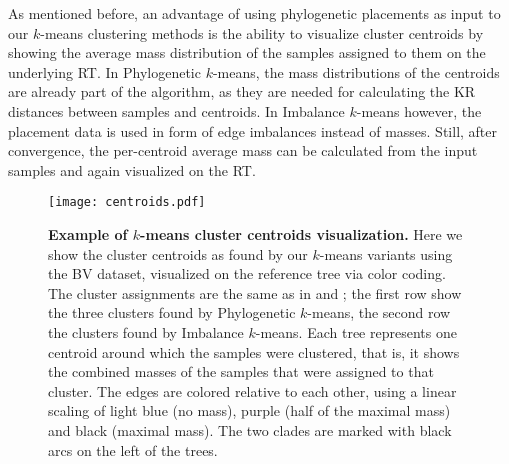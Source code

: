 As mentioned before, an advantage of using phylogenetic placements as input to our $k$-means clustering methods
is the ability to visualize cluster centroids by showing the average mass distribution
of the samples assigned to them on the underlying \acf{RT}.
In Phylogenetic $k$-means, the mass distributions of the centroids are already part of the algorithm,
as they are needed for calculating the KR distances between samples and centroids.
In Imbalance $k$-means however, the placement data is used in form of edge imbalances instead of masses.
Still, after convergence, the per-centroid average mass can be calculated from the input samples
and again visualized on the \ac{RT}.

\begin{figure}[!htb]
    \centering
    \texttt{[image: centroids.pdf]}
    \begin{subfigure}{0pt}
        \label{fig:centroids:sub:red}
    \end{subfigure}
    \begin{subfigure}{0pt}
        \label{fig:centroids:sub:green}
    \end{subfigure}
    \begin{subfigure}{0pt}
        \label{fig:centroids:sub:blue}
    \end{subfigure}
    \begin{subfigure}{0pt}
        \label{fig:centroids:sub:purple}
    \end{subfigure}
    \begin{subfigure}{0pt}
        \label{fig:centroids:sub:orange}
    \end{subfigure}
    \begin{subfigure}{0pt}
        \label{fig:centroids:sub:gray}
    \end{subfigure}
    \caption[Example of $k$-means cluster centroids visualization]{
        \textbf{Example of $k$-means cluster centroids visualization.}
        Here we show the cluster centroids as found by our $k$-means variants using the \ac{BV} dataset,
        visualized on the reference tree via color coding.
        The cluster assignments are the same as in  and ;
        the first row show the three clusters found by Phylogenetic $k$-means,
        the second row the clusters found by Imbalance $k$-means.
        Each tree represents one centroid around which the samples were clustered,
        that is, it shows the combined masses of the samples that were assigned to that cluster.
        The edges are colored relative to each other, using a linear scaling of
        light blue (no mass), purple (half of the maximal mass) and black (maximal mass).
        The two  clades are marked with black arcs on the left of the trees.
    }
    \label{fig:centroids}
\end{figure}

